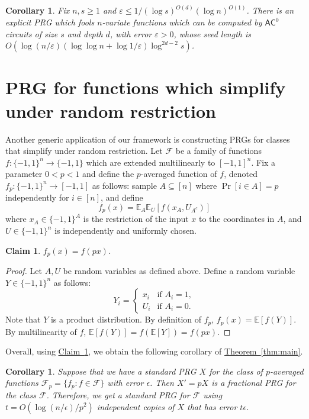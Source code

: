 \documentclass[11pt]{article}
\numberwithin{equation}{section}
\newtheorem{corollary}[theorem]{Corollary}
\newtheorem{claim}[theorem]{Claim}
\theoremstyle{definition}
\theoremstyle{plain}
\newcommand{\cclass}[1]{\textsf{#1}}
\newcommand{\expref}[2]{\hyperref[#2]{#1~\ref{#2}}}
\newcommand{\E}{\mathbb{E}}
\newcommand{\FF}{\mathcal{F}}
\newcommand{\eps}{\varepsilon}
\begin{document}
\begin{corollary}
\label{cor:AC0}
	Fix $n,s \ge 1$ and $\eps\leq 1/(\log s)^{O(d)}(\log n)^{O(1)}$. There is an explicit PRG which fools $n$-variate functions which can be computed
by $\cclass{AC}^0$ circuits of size $s$ and depth $d$, with error $\eps>0$,
whose seed length is $O(\log (n/\eps) (\log \log n + \log 1/\eps) \log^{2d-2} s)$.
\end{corollary}

\section{PRG for functions which simplify under random restriction}
\label{sec:random_restriction}
Another generic application of our framework is constructing PRGs for classes that simplify under random restriction.
Let $\FF$ be a family of functions  $f:\{-1,1\}^n \to \{-1,1\}$  which are extended multilinearly to $[-1,1]^n$. Fix a parameter $0<p<1$ and define the $p$-averaged function of $f$, denoted $f_p:\{-1,1\}^n \to [-1,1]$ as follows:
sample $A \subseteq [n]$ where $\Pr[i \in A]=p$ independently for $i \in [n]$, and define
$$f_p(x) = \E_A\E_U [f(x_A,U_{A^c})]$$
where $x_A \in \{-1,1\}^A$ is the restriction of the input $x$ to the coordinates in $A$, and $U \in \{-1,1\}^n$ is independently and uniformly chosen.
 \begin{claim}
  \label{claim:p_averaged}
 $f_p (x) = f(px)$.
 \end{claim}
 \begin{proof}
 Let $A,U$ be random variables as defined above. Define a random variable
 $Y \in \{-1,1\}^n$ as follows:
$$
Y_i =
\begin{cases}
x_i & \text{if } A_i=1,\\
U_i & \text{if } A_i=0.
\end{cases}
$$
Note that $Y$ is a product distribution.
By definition of $f_p$, $f_p(x) = \E[f(Y)]$. By multilinearity of $f$,
$\E[f(Y)]=f(\E[Y]) = f(px)$.
\end{proof}
Overall, using \expref{Claim}{claim:p_averaged}, we obtain the following corollary of \expref{Theorem}{thm:main}.
\begin{corollary}
%
%
	
Suppose that we have a standard PRG $X$ for the class of $p$-averaged functions $\FF_p = \{f_p : f\in \FF\}$ with error $\epsilon$. Then $X'=pX$ is a fractional PRG for the class $\FF$. Therefore, we get a standard PRG for $\FF$ using $t = O(\log(n/\epsilon)/p^2)$ independent copies of $X$ that has error $t\epsilon$.
\end{corollary}
\end{document}
